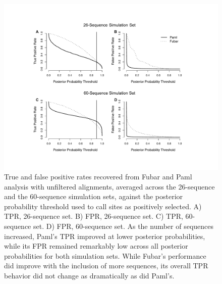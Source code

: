 \documentclass[10pt]{article}
\begin{document}
\begin{figure}[H]
\label{tprfpr}
\centerline{\includegraphics[width=5in]{Figures/tprfpr.pdf}}
\caption{True and false positive rates recovered from Fubar and Paml analysis with unfiltered alignments, averaged across the 26-sequence and the 60-sequence simulation sets, against the posterior probability threshold used to call sites as positively selected. A) TPR, 26-sequence set. B) FPR, 26-sequence set. C) TPR, 60-sequence set. D) FPR, 60-sequence set.  As the number of sequences increased, Paml's TPR improved at lower posterior probabilities, while its FPR remained remarkably low across all posterior probabilities for both simulation sets. While Fubar's performance did improve with the inclusion of more sequences, its overall TPR behavior did not change as dramatically as did Paml's.}
\end{figure}
\end{document}
